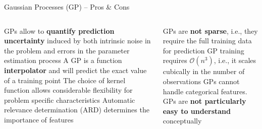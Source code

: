 \begin{frame}{Gaussian Processes (GP) -- Pros \& Cons}

\begin{columns}[onlytextwidth]
  \begin{column}{0.5\textwidth}
    \footnotesize
    \begin{itemize}
      \positem GPs allow to \textbf{quantify prediction uncertainty} induced by both intrinsic noise in the problem and errors in the parameter estimation process
      \positem A GP is a function \textbf{interpolator} and will predict the exact value of a training point
      \positem The choice of kernel function allows considerable flexibility for problem specific characteristics
      \positem Automatic relevance determination (ARD) determines the importance of features
    \end{itemize}
  \end{column}
  \begin{column}{0.5\textwidth}
    \footnotesize
    \begin{itemize}
      \negitem GPs are \textbf{not sparse}, i.e., they require the full training data for prediction
      \negitem GP training requires $\mathcal{O}(n^3)$, i.e., it scales cubically in the number of observations
      \negitem GPs cannot handle categorical features.
      \negitem GPs are \textbf{not particularly easy to understand} conceptually
    \end{itemize}
  \end{column}
\end{columns}

\end{frame}
